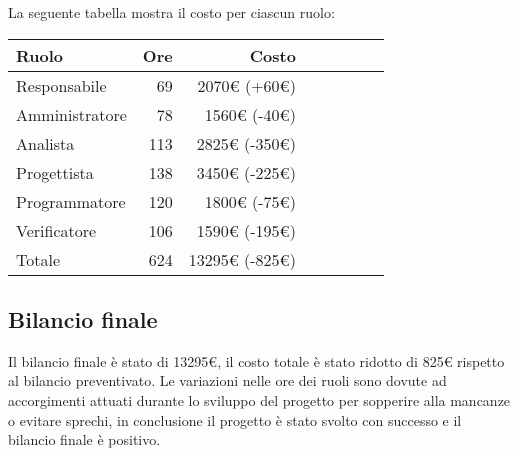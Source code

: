 La seguente tabella mostra il costo per ciascun ruolo:
\begin{table}[H]
    \begin{tabularx}{\linewidth}{X|rrrrrrr}
    \rowcolor{gray!30}Ruolo & Ore & Costo \\
    \hline
    Responsabile                            & 69     & 2070€ (+60€)\\
    \rowcolor{gray!10}Amministratore        & 78     & 1560€ (-40€)\\
    Analista                                & 113    & 2825€ (-350€)\\
    \rowcolor{gray!10}Progettista           & 138    & 3450€ (-225€) \\
    Programmatore                           & 120    & 1800€ (-75€) \\
    \rowcolor{gray!10}Verificatore          & 106    & 1590€ (-195€)\\
    \hline Totale                           & 624    & 13295€ (-825€) \\ 
    \end{tabularx}
\end{table}


\subsection{Bilancio finale}

Il bilancio finale è stato di 13295€, il costo totale è stato ridotto di 825€ rispetto al bilancio preventivato. Le variazioni nelle ore dei ruoli sono dovute ad accorgimenti attuati durante lo sviluppo del progetto per sopperire alla mancanze o evitare sprechi, in conclusione il progetto è stato svolto con successo e il bilancio finale è positivo.